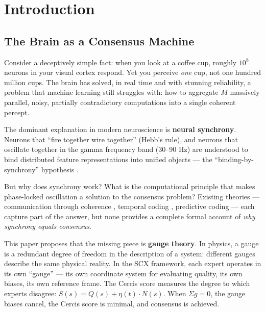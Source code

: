 \documentclass[12pt,a4paper]{article}
\theoremstyle{remark}
\newcommand{\SCX}{\textsf{SCX}}
\newcommand{\Cercis}{\textsf{Cercis}}
\begin{document}
\tableofcontents
\newpage

\section{Introduction}
\label{sec:intro}

\subsection{The Brain as a Consensus Machine}

Consider a deceptively simple fact: when you look at a coffee cup, roughly
$10^8$ neurons in your visual cortex respond. Yet you perceive \emph{one} cup,
not one hundred million cups. The brain has solved, in real time and with
stunning reliability, a problem that machine learning still struggles with:
how to aggregate $M$ massively parallel, noisy, partially contradictory
computations into a single coherent percept.

The dominant explanation in modern neuroscience is \textbf{neural synchrony}.
Neurons that ``fire together wire together'' (Hebb's rule), and neurons that
oscillate together in the gamma frequency band (30--90 Hz) are understood to
bind distributed feature representations into unified objects --- the
``binding-by-synchrony'' hypothesis \cite{singer1999neuronal, fries2015rhythms}.

But why does synchrony work? What is the computational principle that makes
phase-locked oscillation a solution to the consensus problem? Existing
theories --- communication through coherence \cite{fries2005mechanism},
temporal coding \cite{buzsaki2010neural}, predictive coding
\cite{rao1999predictive} --- each capture part of the answer, but none provides
a complete formal account of \emph{why synchrony equals consensus}.

This paper proposes that the missing piece is \textbf{gauge theory}. In
physics, a gauge is a redundant degree of freedom in the description of a
system: different gauges describe the same physical reality. In the \SCX{}
framework, each expert operates in its own ``gauge'' --- its own coordinate
system for evaluating quality, its own biases, its own reference frame. The
\Cercis{} score measures the degree to which experts disagree:
$S(s) = Q(s) + \eta(t) \cdot N(s)$. When $\Sigma g = 0$, the gauge biases
cancel, the \Cercis{} score is minimal, and consensus is achieved.
\end{document}
